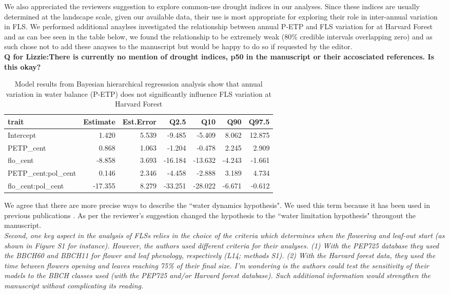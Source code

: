 \documentclass{article}[11pt]
\begin{document}
\noindent We also appreciated the reviewers suggestion to explore common-use drought indices in our analyses. Since these indices are usually determined at the landscape scale, given our available data, their use is most appropriate for exploring their role in inter-annual variation in FLS. We performed additional anaylses investigated the relationship between annual P-ETP and FLS variation for at Harvard Forest and as can bee seen in the table below, we found the relationship to be extremely weak (80\% credible intervals overlapping zero) and as such chose not to add these anayses to the manuscript but would be happy to do so if requested by the editor.\\

\textbf{Q for Lizzie:There is currently no mention of drought indices, p50 in the manuscript or their accosciated references. Is this okay?}\\

\begin{table}[ht]
\centering
\begin{tabular}{lrrrrrr}
  \hline
  trait & Estimate & Est.Error & Q2.5 & Q10 & Q90 & Q97.5 \\ 
  \hline
 Intercept & 1.420 & 5.539 & -9.485 & -5.409 & 8.062 & 12.875 \\ 
   PETP\_cent & 0.868 & 1.063 & -1.204 & -0.478 & 2.245 & 2.909 \\ 
   flo\_cent & -8.858 & 3.693 & -16.184 & -13.632 & -4.243 & -1.661 \\ 
   PETP\_cent:pol\_cent & 0.146 & 2.346 & -4.458 & -2.888 & 3.189 & 4.734 \\ 
   flo\_cent:pol\_cent & -17.355 & 8.279 & -33.251 & -28.022 & -6.671 & -0.612 \\ 
   \hline
\end{tabular}
\caption{Model results from Bayesian hierarchical regresssion analysis 
       show that annual variation in water balance (P-ETP) does not significantly influence FLS variation at Harvard Forest} 
\label{HF.PETP}
\end{table}


\noindent We agree that there are more precise ways to describe the ``water dynamics hypothesis". We used this term because it has been used in previous publications \citep{Gougherty2018}. As per the reviewer's suggestion changed the hypothesis to the ``water limitation hypothesis" througout the manuscript.\\

\emph{Second, one key aspect in the analysis of FLSs relies in the choice of the criteria which determines when the flowering and leaf-out start (as shown in Figure S1 for instance). However, the authors used different criteria for their analyses. (1) With the PEP725 database they used the BBCH60 and BBCH11 for flower and leaf phenology, respectively (L14; methods S1). (2) With the Harvard forest data, they used the time between flowers opening and leaves reaching 75\% of their final size. I'm wondering is the authors could test the sensitivity of their models to the BBCH classes used (with the PEP725 and/or Harvard forest database). Such additional information would strengthen the manuscript without complicating its reading.}
\end{document}
